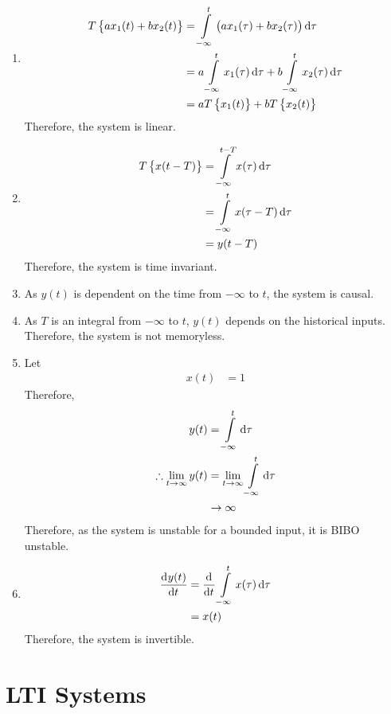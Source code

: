 \documentclass[titlepage, fleqn, a4paper, 12pt, twoside]{article}
\theoremstyle{definition}
\theoremstyle{theorem}
\begin{document}
\begin{solution}
	\begin{enumerate}[leftmargin=*]
		\item
			\begin{align*}
				T\left\{ a x_1(t) + b x_2(t) \right\} &= \int\limits_{-\infty}^{t} \left( a x_1(\tau) + b x_2(\tau) \right) \dif \tau\\
				&= a \int\limits_{-\infty}^{t} x_1(\tau) \dif \tau + b \int\limits_{-\infty}^{t} x_2(\tau) \dif \tau\\
				&= a T\left\{ x_1(t) \right\} + b T\left\{ x_2(t) \right\}
			\end{align*}
			Therefore, the system is linear.
		\item
			\begin{align*}
				T\left\{ x(t - T) \right\} &= \int\limits_{-\infty}^{t - T} x(\tau) \dif \tau\\
				&= \int\limits_{-\infty}^{t} x(\tau - T) \dif \tau\\
				&= y(t - T)
			\end{align*}
			Therefore, the system is time invariant.
		\item
			As $y(t)$ is dependent on the time from $-\infty$ to $t$, the system is causal.
		\item
			As $T$ is an integral from $-\infty$ to $t$, $y(t)$ depends on the historical inputs.
			Therefore, the system is not memoryless.
		\item
			Let
			\begin{align*}
				x(t) &= 1
			\end{align*}
			Therefore,
			\begin{align*}
				y(t) &= \int\limits_{-\infty}^{t} \dif \tau\\
				\therefore \lim\limits_{t \to \infty} y(t) &= \lim\limits_{t \to \infty} \int\limits_{-\infty}^{t} \dif \tau\\
				&\to \infty
			\end{align*}
			Therefore, as the system is unstable for a bounded input, it is BIBO unstable.
		\item
			\begin{align*}
				\dod{y(t)}{t} &= \dod{}{t} \int\limits_{-\infty}^{t} x(\tau) \dif \tau\\
				&= x(t)
			\end{align*}
			Therefore, the system is invertible.
	\end{enumerate}
\end{solution}

\section{LTI Systems}
\end{document}
